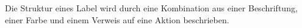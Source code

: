 \documentclass{article}
\begin{document}
    Die Struktur eines Label wird durch eine Kombination aus einer Beschriftung, einer Farbe und einem Verweis auf eine Aktion beschrieben.\\
\end{document}
